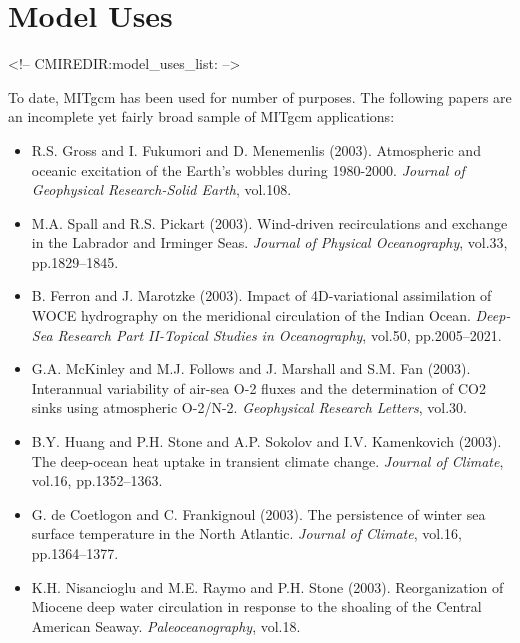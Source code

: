 
\chapter{Model Uses}
\begin{rawhtml}
<!-- CMIREDIR:model_uses_list: -->
\end{rawhtml}



To date, MITgcm has been used for number of purposes.  The following
papers are an incomplete yet fairly broad sample of MITgcm
applications:

\begin{itemize}

\item R.S. Gross and I. Fukumori and D. Menemenlis (2003).
Atmospheric and oceanic excitation of the Earth's wobbles during 1980-2000.
{\it Journal of Geophysical Research-Solid Earth}, vol.108.

\item M.A. Spall and R.S. Pickart (2003).
Wind-driven recirculations and exchange in the Labrador and Irminger Seas. 
{\it Journal of Physical Oceanography}, vol.33, pp.1829--1845. 

\item B. Ferron and J. Marotzke (2003).
Impact of 4D-variational assimilation of WOCE hydrography on the
meridional circulation of the Indian Ocean. {\it Deep-Sea Research Part
II-Topical Studies in Oceanography}, vol.50, pp.2005--2021.

\item G.A. McKinley and M.J. Follows and J. Marshall and S.M. Fan (2003).
Interannual variability of air-sea O-2 fluxes and the determination of
CO2 sinks using atmospheric O-2/N-2. {\it Geophysical Research Letters},
vol.30. 

\item B.Y. Huang and P.H. Stone and A.P. Sokolov and I.V. Kamenkovich
(2003). The deep-ocean heat uptake in transient climate change. {\it Journal
of Climate}, vol.16, pp.1352--1363. 

\item G. de Coetlogon and C. Frankignoul (2003). The persistence of winter
sea surface temperature in the North Atlantic. {\it Journal of Climate},
vol.16, pp.1364--1377. 

\item K.H. Nisancioglu and M.E. Raymo and P.H. Stone (2003).
Reorganization of Miocene deep water circulation in response to the
shoaling of the Central American Seaway. {\it Paleoceanography}, vol.18. 


\end{itemize}
